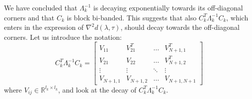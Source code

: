 We have concluded that $\Lambda_k^{-1}$ is decaying exponentially towards its off-diagonal corners and that $C_k$ is block bi-banded. This suggests that also $C_k^T \Lambda_k^{-1} C_k$, which enters in the expression of $\nabla^2 d(\lambda, \tau)$, should decay towards the off-diagonal corners. Let us introduce the notation:
\begin{equation}
C_k^T \Lambda_k^{-1} C_k = \left[ \begin{array}{cccc}
V_{11} & V_{21}^T & \hdots & V_{N+1,1}^T \\
V_{21} & V_{22} & \hdots & V_{N+1,2}^T \\
\vdots & \vdots  & \ddots & \vdots \\
V_{N+1,1} & V_{N+1,2} & \hdots & V_{N+1,N+1}
\end{array} \right]
\end{equation}
where $V_{ij} \in \mathbb{R}^{l_{k} \times l_{k}}$, and look at the decay of $C_k^T \Lambda_k^{-1} C_k$.

